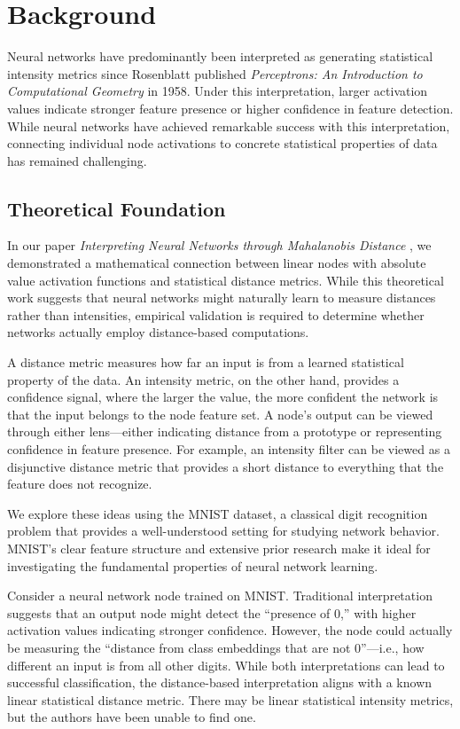 \section{Background}

Neural networks have predominantly been interpreted as generating statistical intensity metrics since Rosenblatt published \textit{Perceptrons: An Introduction to Computational Geometry} in 1958. Under this interpretation, larger activation values indicate stronger feature presence or higher confidence in feature detection. While neural networks have achieved remarkable success with this interpretation, connecting individual node activations to concrete statistical properties of data has remained challenging.

\subsection{Theoretical Foundation}

In our paper \textit{Interpreting Neural Networks through Mahalanobis Distance} \citep{oursland2024interpreting}, we demonstrated a mathematical connection between linear nodes with absolute value activation functions and statistical distance metrics. While this theoretical work suggests that neural networks might naturally learn to measure distances rather than intensities, empirical validation is required to determine whether networks actually employ distance-based computations.

A distance metric measures how far an input is from a learned statistical property of the data. An intensity metric, on the other hand, provides a confidence signal, where the larger the value, the more confident the network is that the input belongs to the node feature set. A node's output can be viewed through either lens—either indicating distance from a prototype or representing confidence in feature presence. For example, an intensity filter can be viewed as a disjunctive distance metric that provides a short distance to everything that the feature does not recognize.

We explore these ideas using the MNIST dataset, a classical digit recognition problem that provides a well-understood setting for studying network behavior. MNIST's clear feature structure and extensive prior research make it ideal for investigating the fundamental properties of neural network learning.

Consider a neural network node trained on MNIST. Traditional interpretation suggests that an output node might detect the ``presence of 0,'' with higher activation values indicating stronger confidence. However, the node could actually be measuring the ``distance from class embeddings that are not 0''—i.e., how different an input is from all other digits. While both interpretations can lead to successful classification, the distance-based interpretation aligns with a known linear statistical distance metric. There may be linear statistical intensity metrics, but the authors have been unable to find one.

